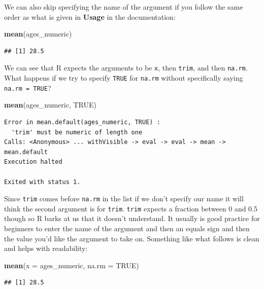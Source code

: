 \documentclass[]{tufte-book}
\newenvironment{Shaded}{\begin{snugshade}}{\end{snugshade}}
\newcommand{\KeywordTok}[1]{\textcolor[rgb]{0.13,0.29,0.53}{\textbf{{#1}}}}
\newcommand{\DataTypeTok}[1]{\textcolor[rgb]{0.13,0.29,0.53}{{#1}}}
\newcommand{\OtherTok}[1]{\textcolor[rgb]{0.56,0.35,0.01}{{#1}}}
\newcommand{\NormalTok}[1]{{#1}}
\begin{document}
We can also skip specifying the name of the argument if you follow the
same order as what is given in \textbf{Usage} in the documentation:

\begin{Shaded}
\begin{Highlighting}[]
\KeywordTok{mean}\NormalTok{(ages_numeric)}
\end{Highlighting}
\end{Shaded}

\begin{verbatim}
## [1] 28.5
\end{verbatim}

We can see that R expects the arguments to be \texttt{x}, then
\texttt{trim}, and then \texttt{na.rm}. What happens if we try to
specify \texttt{TRUE} for \texttt{na.rm} without specifically saying
\texttt{na.rm\ =\ TRUE}?

\begin{Shaded}
\begin{Highlighting}[]
\KeywordTok{mean}\NormalTok{(ages_numeric, }\OtherTok{TRUE}\NormalTok{)}
\end{Highlighting}
\end{Shaded}

\begin{verbatim}
Error in mean.default(ages_numeric, TRUE) : 
  'trim' must be numeric of length one
Calls: <Anonymous> ... withVisible -> eval -> eval -> mean -> mean.default
Execution halted

Exited with status 1.
\end{verbatim}

Since \texttt{trim} comes before \texttt{na.rm} in the list if we don't
specify our name it will think the second argument is for \texttt{trim}.
\texttt{trim} expects a fraction between 0 and 0.5 though so R barks at
us that it doesn't understand. It usually is good practice for beginners
to enter the name of the argument and then an equals sign and then the
value you'd like the argument to take on. Something like what follows is
clean and helps with readability:

\begin{Shaded}
\begin{Highlighting}[]
\KeywordTok{mean}\NormalTok{(}\DataTypeTok{x =} \NormalTok{ages_numeric, }\DataTypeTok{na.rm =} \OtherTok{TRUE}\NormalTok{)}
\end{Highlighting}
\end{Shaded}

\begin{verbatim}
## [1] 28.5
\end{verbatim}
\end{document}

